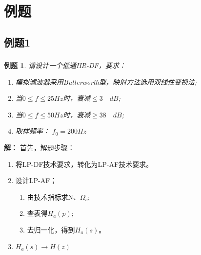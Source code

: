 \documentclass[notheorems,compress,mathserif,table]{beamer}
\newtheorem{example}{例题}
\begin{document}
\section{例题}
%
\subsection{例题1}
\begin{frame}\frametitle{}%
\begin{example}
请设计一个低通IIR-DF，要求：
\begin{enumerate}
  \item[(1)] 模拟滤波器采用Butterworth型，映射方法选用双线性变换法;
  \item[(2)] 当$0\leqslant f \leqslant 25Hz$时，衰减$\leqslant 3\quad dB$;
  \item[(3)] 当$0\leqslant f \leqslant 50Hz$时，衰减$\geqslant 38\quad dB$;
  \item[(4)] 取样频率： $f_0 = 200Hz$
\end{enumerate}
\end{example}
\textbf{解：}
  首先，解题步骤：

  \begin{enumerate}
     \item 将LP-DF技术要求，转化为LP-AF技术要求。
     \item 设计LP-AF；
         \begin{enumerate}
           \item 由技术指标求N、$\Omega_c$;
           \item 查表得$H_a(p)$;
           \item 去归一化，得到$H_a(s)$。
         \end{enumerate}
     \item $H_a(s)\longrightarrow H(z)$
   \end{enumerate}

\end{frame}
\end{document}
